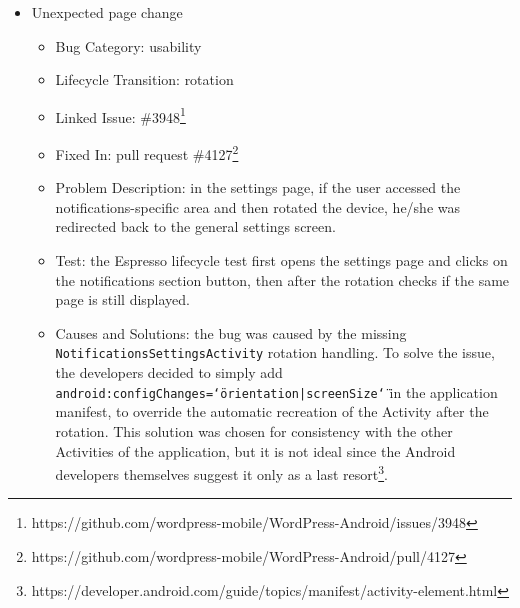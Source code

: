\documentclass[11pt,a4paper,notitlepage]{article}
\begin{document}
\begin{itemize}
\begin{itemize}
		\item Fixed In: pull request \#3577\footnote{https://github.com/wordpress-mobile/WordPress-Android/pull/3577} 
		\item Problem Description: reading a long blog post, pausing and resuming the application caused most of the content to be invisible to the user.
		\item Test: the Espresso lifecycle test opens a blog post, scrolls down and, after the pause, checks that all the content is displayed.
		\item Causes and Solutions: the \texttt{WebView} component used to display the page was paused during \texttt{onPause()} but not resumed during \texttt{onResume()}, and so the simple solution of the bug was to add the latter call.
	\end{itemize}
	\item Unexpected page change
	\begin{itemize}
		\item Bug Category: usability
		\item Lifecycle Transition: rotation
		\item Linked Issue: \#3948\footnote{https://github.com/wordpress-mobile/WordPress-Android/issues/3948}
		\item Fixed In: pull request \#4127\footnote{https://github.com/wordpress-mobile/WordPress-Android/pull/4127} 
		\item Problem Description: in the settings page, if the user accessed the notifications-specific area and then rotated the device, he/she was redirected back to the general settings screen. 
		\item Test: the Espresso lifecycle test first opens the settings page and clicks on the notifications section button, then after the rotation checks if the same page is still displayed.
		\item Causes and Solutions: the bug was caused by the missing \texttt{NotificationsSettingsActivity} rotation handling. To solve the issue, the developers decided to simply add \texttt{android:configChanges=\char`\"orientation|screenSize\char`\"} in the application manifest, to override the automatic recreation of the Activity after the rotation. This solution was chosen for consistency with the other Activities of the application, but it is not ideal since the Android developers themselves suggest it only as a last resort\footnote{https://developer.android.com/guide/topics/manifest/activity-element.html}.
	\end{itemize}
\end{itemize}
\end{document}
